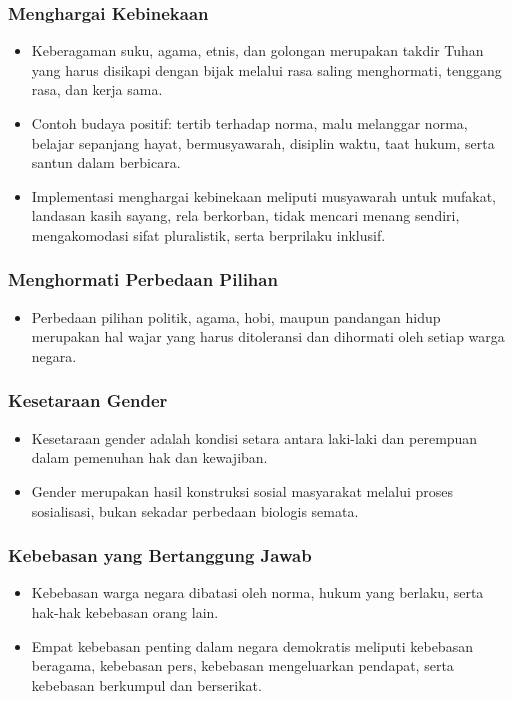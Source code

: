 \subsubsection{Menghargai Kebinekaan}
\begin{itemize}
\item Keberagaman suku, agama, etnis, dan golongan merupakan takdir Tuhan yang harus disikapi dengan bijak melalui rasa saling menghormati, tenggang rasa, dan kerja sama.
\item Contoh budaya positif: tertib terhadap norma, malu melanggar norma, belajar sepanjang hayat, bermusyawarah, disiplin waktu, taat hukum, serta santun dalam berbicara.
\item Implementasi menghargai kebinekaan meliputi musyawarah untuk mufakat, landasan kasih sayang, rela berkorban, tidak mencari menang sendiri, mengakomodasi sifat pluralistik, serta berprilaku inklusif.
\end{itemize}

\subsubsection{Menghormati Perbedaan Pilihan}
\begin{itemize}
\item Perbedaan pilihan politik, agama, hobi, maupun pandangan hidup merupakan hal wajar yang harus ditoleransi dan dihormati oleh setiap warga negara.
\end{itemize}

\subsubsection{Kesetaraan Gender}
\begin{itemize}
\item Kesetaraan gender adalah kondisi setara antara laki-laki dan perempuan dalam pemenuhan hak dan kewajiban.
\item Gender merupakan hasil konstruksi sosial masyarakat melalui proses sosialisasi, bukan sekadar perbedaan biologis semata.
\end{itemize}

\subsubsection{Kebebasan yang Bertanggung Jawab}
\begin{itemize}
\item Kebebasan warga negara dibatasi oleh norma, hukum yang berlaku, serta hak-hak kebebasan orang lain.
\item Empat kebebasan penting dalam negara demokratis meliputi kebebasan beragama, kebebasan pers, kebebasan mengeluarkan pendapat, serta kebebasan berkumpul dan berserikat.
\end{itemize}

